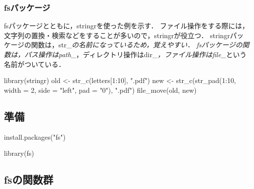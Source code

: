 \documentclass[
]{article}
\newenvironment{Shaded}{\begin{snugshade}}{\end{snugshade}}
\newcommand{\AttributeTok}[1]{\textcolor[rgb]{0.77,0.63,0.00}{#1}}
\newcommand{\DecValTok}[1]{\textcolor[rgb]{0.00,0.00,0.81}{#1}}
\newcommand{\FunctionTok}[1]{\textcolor[rgb]{0.00,0.00,0.00}{#1}}
\newcommand{\NormalTok}[1]{#1}
\newcommand{\OtherTok}[1]{\textcolor[rgb]{0.56,0.35,0.01}{#1}}
\newcommand{\SpecialCharTok}[1]{\textcolor[rgb]{0.00,0.00,0.00}{#1}}
\newcommand{\StringTok}[1]{\textcolor[rgb]{0.31,0.60,0.02}{#1}}
\begin{document}
\hypertarget{fsux30d1ux30c3ux30b1ux30fcux30b8}{%
\subsubsection{fsパッケージ}\label{fsux30d1ux30c3ux30b1ux30fcux30b8}}

fsパッケージとともに，stringrを使った例を示す．
ファイル操作をする際には，文字列の置換・検索などをすることが多いので，stringrが役立つ．
stringrパッケージの関数は，str\_\emph{の名前になっているため，覚えやすい．
fsパッケージの関数は，パス操作はpath\_}，ディレクトリ操作はdir\_\emph{，ファイル操作はfile\_}という名前がついている．

\begin{Shaded}
\begin{Highlighting}[]
\FunctionTok{library}\NormalTok{(stringr)}
\NormalTok{old }\OtherTok{\textless{}{-}} \FunctionTok{str\_c}\NormalTok{(letters[}\DecValTok{1}\SpecialCharTok{:}\DecValTok{10}\NormalTok{], }\StringTok{".pdf"}\NormalTok{)}
\NormalTok{new }\OtherTok{\textless{}{-}} \FunctionTok{str\_c}\NormalTok{(}\FunctionTok{str\_pad}\NormalTok{(}\DecValTok{1}\SpecialCharTok{:}\DecValTok{10}\NormalTok{, }\AttributeTok{width =} \DecValTok{2}\NormalTok{, }\AttributeTok{side =} \StringTok{"left"}\NormalTok{, }\AttributeTok{pad =} \StringTok{"0"}\NormalTok{), }\StringTok{".pdf"}\NormalTok{)}
\FunctionTok{file\_move}\NormalTok{(old, new)}
\end{Highlighting}
\end{Shaded}

\hypertarget{ux6e96ux5099}{%
\subsection{準備}\label{ux6e96ux5099}}

\begin{Shaded}
\begin{Highlighting}[]
\FunctionTok{install.packages}\NormalTok{(}\StringTok{"fs"}\NormalTok{)}
\end{Highlighting}
\end{Shaded}

\begin{Shaded}
\begin{Highlighting}[]
\FunctionTok{library}\NormalTok{(fs)}
\end{Highlighting}
\end{Shaded}

\hypertarget{fsux306eux95a2ux6570ux7fa4}{%
\subsection{fsの関数群}\label{fsux306eux95a2ux6570ux7fa4}}
\end{document}
